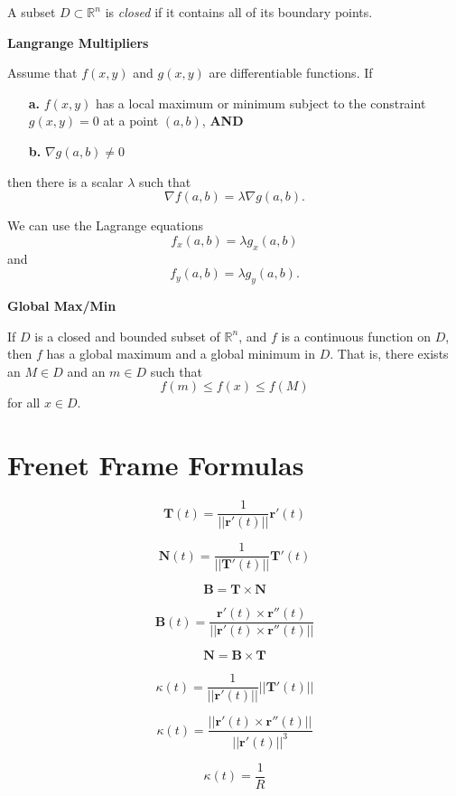 \documentclass{article}
\begin{document}
A subset \( D \subset \mathbb{R}^n \) is \textit{closed} if it contains all of its boundary points.

\vspace{0.5cm}


\noindent \textbf{Langrange Multipliers}

Assume that \( f(x,y) \) and \( g(x,y) \) are differentiable functions. If
\begin{enumerate}
    \item[\textbf{a.}] \( f(x, y) \) has a local maximum or minimum subject to the constraint \( g(x, y) = 0 \) at a point \( (a, b) \), \textbf{AND}
    \item[\textbf{b.}] \( \nabla g(a, b) \neq 0 \)
\end{enumerate}
then there is a scalar \( \lambda \) such that
\[ \nabla f(a, b) = \lambda \nabla g(a, b). \]

We can use the Lagrange equations
\[ f_x(a, b) = \lambda g_x(a, b) \] and \[ f_y(a, b) = \lambda g_y(a, b). \]


\vspace{0.5cm}

\noindent \textbf{Global Max/Min}

If \( D \) is a closed and bounded subset of \( \mathbb{R}^n \), and \( f \) is a continuous function on \( D \), then \( f \) has a global maximum and a global minimum in \( D \). That is, there exists an \( M \in D \) and an \( m \in D \) such that 
\[ f(m) \leq f(x) \leq f(M) \]
for all \( x \in D \).

\vspace{0.75cm}

\section*{Frenet Frame Formulas}

$$\bm{T}(t) = \frac{1}{||\bm{r}'(t)||}\bm{r}'(t)$$

$$\bm{N}(t) = \frac{1}{||\bm{T}'(t)||}\bm{T}'(t)$$

$$\bm{B} = \bm{T} \times \bm{N}$$

$$\bm{B}(t) = \frac{\bm{r}'(t) \times \bm{r}''(t)}{\left| \left| \bm{r}'(t) \times \bm{r}''(t)\right| \right|}$$

$$\bm{N} = \bm{B} \times \bm{T}$$

$$\kappa(t) = \frac{1}{||\bm{r}'(t)||}||\bm{T}'(t)||$$

$$\kappa(t) = \frac{||\bm{r}'(t) \times \bm{r}''(t)||}{||\bm{r}'(t)||^3}$$

$$\kappa(t) = \frac{1}{R}$$
\end{document}

